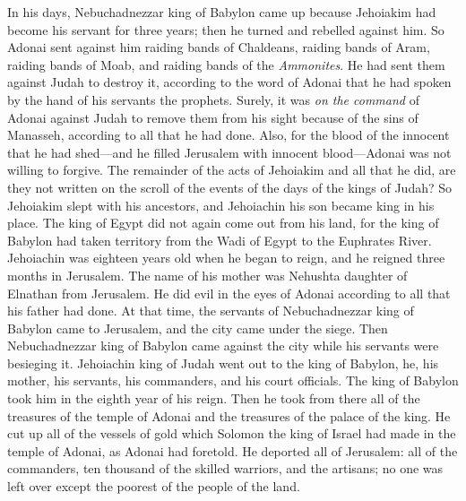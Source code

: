 \begin{biblechapter} %
 In his days, Nebuchadnezzar king of Babylon came up because Jehoiakim had become his servant for three years; then he turned and rebelled against him.
\verse So Adonai sent against him raiding bands of Chaldeans, raiding bands of Aram, raiding bands of Moab, and raiding bands of the \textit{Ammonites}. He had sent them against Judah to destroy it, according to the word of Adonai that he had spoken by the hand of his servants the prophets.
\verse Surely, it was \textit{on the command} of Adonai against Judah to remove them from his sight because of the sins of Manasseh, according to all that he had done.
\verse Also, for the blood of the innocent that he had shed—and he filled Jerusalem with innocent blood—Adonai was not willing to forgive.
\verse The remainder of the acts of Jehoiakim and all that he did, are they not written on the scroll of the events of the days of the kings of Judah?
\verse So Jehoiakim slept with his ancestors, and Jehoiachin his son became king in his place.
\verse The king of Egypt did not again come out from his land, for the king of Babylon had taken territory from the Wadi of Egypt to the Euphrates River.
 Jehoiachin was eighteen years old when he began to reign, and he reigned three months in Jerusalem. The name of his mother was Nehushta daughter of Elnathan from Jerusalem.
\verse He did evil in the eyes of Adonai according to all that his father had done.
 At that time, the servants of Nebuchadnezzar king of Babylon came to Jerusalem, and the city came under the siege.
\verse Then Nebuchadnezzar king of Babylon came against the city while his servants were besieging it.
\verse Jehoiachin king of Judah went out to the king of Babylon, he, his mother, his servants, his commanders, and his court officials. The king of Babylon took him in the eighth year of his reign.
\verse Then he took from there all of the treasures of the temple of Adonai and the treasures of the palace of the king. He cut up all of the vessels of gold which Solomon the king of Israel had made in the temple of Adonai, as Adonai had foretold.
\verse He deported all of Jerusalem: all of the commanders, ten thousand of the skilled warriors, and the artisans; no one was left over except the poorest of the people of the land.

\end{biblechapter}
